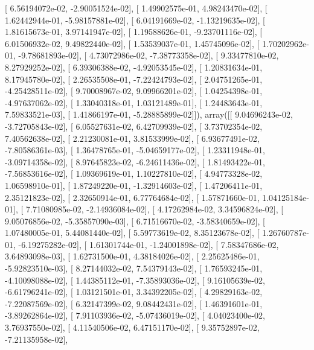 \documentclass{article}
\begin{document}
       [  6.56194072e-02,  -2.90051524e-02],
       [  1.49902575e-01,   4.98243470e-02],
       [  1.62442944e-01,  -5.98157881e-02],
       [  6.04191669e-02,  -1.13219635e-02],
       [  1.81615673e-01,   3.97141947e-02],
       [  1.19588626e-01,  -9.23701116e-02],
       [  6.01506932e-02,   9.49822440e-02],
       [  1.53539037e-01,   1.45745096e-02],
       [  1.70202962e-01,  -9.78681893e-02],
       [  4.73072986e-02,  -7.38773358e-02],
       [  9.33477810e-02,   8.27929252e-02],
       [  6.39306388e-02,  -4.92053545e-02],
       [  1.20831634e-01,   8.17945780e-02],
       [  2.26535508e-01,  -7.22424793e-02],
       [  2.04751265e-01,  -4.25428511e-02],
       [  9.70008967e-02,   9.09966201e-02],
       [  1.04254398e-01,  -4.97637062e-02],
       [  1.33040318e-01,   1.03121489e-01],
       [  1.24483643e-01,   7.59833521e-03],
       [  1.41866197e-01,  -5.28885899e-02]]), array([[  9.04696243e-02,  -3.72705843e-02],
       [  6.05527631e-02,   6.42709939e-02],
       [  3.73702354e-02,   7.40562638e-02],
       [  2.21230081e-01,   3.81533999e-02],
       [  6.93677491e-02,  -7.80586361e-03],
       [  1.36478765e-01,  -5.04659177e-02],
       [  1.23311948e-01,  -3.09714358e-02],
       [  8.97645823e-02,  -6.24611436e-02],
       [  1.81493422e-01,  -7.56853616e-02],
       [  1.09369619e-01,   1.10227810e-02],
       [  4.94773328e-02,   1.06598910e-01],
       [  1.87249220e-01,  -1.32914603e-02],
       [  1.47206411e-01,   2.35121823e-02],
       [  2.32650914e-01,   6.77764684e-02],
       [  1.57871660e-01,   1.04125184e-01],
       [  7.71080985e-02,  -2.14936084e-02],
       [  4.17262984e-02,   3.34596824e-02],
       [  9.05076856e-02,  -5.35857090e-03],
       [  6.71516670e-02,  -3.58340659e-02],
       [  1.07480005e-01,   5.44081440e-02],
       [  5.59773619e-02,   8.35123678e-02],
       [  1.26760787e-01,  -6.19275282e-02],
       [  1.61301744e-01,  -1.24001898e-02],
       [  7.58347686e-02,   3.64893098e-03],
       [  1.62731500e-01,   4.38184026e-02],
       [  2.25625486e-01,  -5.92823510e-03],
       [  8.27144032e-02,   7.54379143e-02],
       [  1.76593245e-01,  -4.10098088e-02],
       [  1.44385112e-01,  -7.35893036e-02],
       [  9.16105639e-02,  -6.61796241e-02],
       [  1.03121501e-01,   3.34392205e-02],
       [  4.29829163e-02,  -7.22087569e-02],
       [  6.32147399e-02,   9.08442431e-02],
       [  1.46391601e-01,  -3.89262864e-02],
       [  7.91103936e-02,  -5.07436019e-02],
       [  4.04023400e-02,   3.76937550e-02],
       [  4.11540506e-02,   6.47151170e-02],
       [  9.35752897e-02,  -7.21135958e-02],
\end{document}

